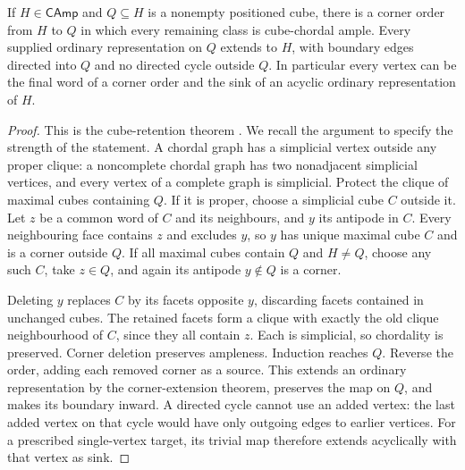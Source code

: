\begin{proposition}
\label{prop:cube-chordal-peeling}
If $H\in\mathsf{CAmp}$ and $Q\subseteq H$ is a nonempty positioned
cube, there is a corner order from $H$ to $Q$ in which every remaining
class is cube-chordal ample. Every supplied ordinary representation on $Q$
extends to $H$, with boundary edges directed into $Q$ and no directed
cycle outside $Q$. In particular every vertex can be the final word of
a corner order and the sink of an acyclic ordinary representation of $H$.
\end{proposition}
\begin{proof}
This is the cube-retention theorem
\cite[\nolinkurl{thm:damp-chordal-cube-retention}]{AmpleCampaign}.
We recall the argument to specify the strength of the statement.
A chordal graph has a simplicial vertex outside any proper clique:
a noncomplete chordal graph has two nonadjacent simplicial vertices,
and every vertex of a complete graph is simplicial. Protect the clique
of maximal cubes containing $Q$. If it is proper, choose a simplicial
cube $C$ outside it. Let $z$ be a common word of $C$ and its neighbours,
and $y$ its antipode in $C$. Every neighbouring face contains $z$ and
excludes $y$, so $y$ has unique maximal cube $C$ and is a corner outside $Q$.
If all maximal cubes contain $Q$ and $H\ne Q$, choose any such $C$,
take $z\in Q$, and again its antipode $y\notin Q$ is a corner.

Deleting $y$ replaces $C$ by its facets opposite $y$, discarding facets
contained in unchanged cubes. The retained facets form a clique with
exactly the old clique neighbourhood of $C$, since they all contain $z$.
Each is simplicial, so chordality is preserved. Corner deletion preserves
ampleness. Induction reaches $Q$.
Reverse the order, adding each removed corner as a source. This extends
an ordinary representation by the corner-extension theorem, preserves the
map on $Q$, and makes its boundary inward. A directed cycle cannot use
an added vertex: the last added vertex on that cycle would have only
outgoing edges to earlier vertices. For a prescribed single-vertex target,
its trivial map therefore extends acyclically with that vertex as sink.
\end{proof}

